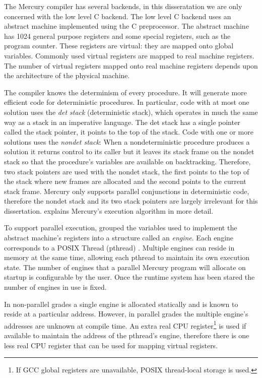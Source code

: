 
The Mercury compiler has several backends,
in this disseratation we are only concerned with the low level C backend.
The low level C backend uses an abstract machine implemented using the C
preprocessor.
The abstract machine has 1024 general purpose registers and some
special registers, such as the program counter.
These registers are virtual:
they are mapped onto global variables.
Commonly used virtual registers are mapped to real machine registers.
The number of virtual registers mapped onto real machine registers depends upon
the architecture of the physical machine.

The compiler knows the determinism of every procedure.
It will generate more efficient code for deterministic procedures.
In particular,
code with at most one solution uses the \emph{det stack} (deterministic
stack),
which operates in much the same way as a stack in an imperative
language.
The det stack has a single pointer called the stack pointer,
it points to the top of the stack.
Code with one or more solutions uses the \emph{nondet stack}:
When a nondeterministic procedure produces a solution it returns control to
its caller but
it leaves its stack frame on the nondet stack so that
the procedure's variables are available on backtracking.
Therefore,
two stack pointers are used with the nondet stack,
the first points to the top of the stack where new frames are allocated
and the second points to the current stack frame.
Mercury only supports parallel conjunctions in deterministic code,
therefore the nondet stack and its two stack pointers are largely irrelevant
for this dissertation.
\citet{mercury_jlp} explains Mercury's execution algorithm in more detail.

To support parallel execution,
\citet{conway:2002:par} grouped the variables used to implement the abstract
machine's registers into a structure called an \emph{engine}.
Each engine corresponds to a POSIX Thread (pthread)
\citep{butenhof1997:pthreads}.
Multiple engines can reside in memory at the same time,
allowing each pthread to maintain its own execution state.
The number of engines that a parallel Mercury program will allocate on startup
is configurable by the user.
Once the runtime system has been stared the number of engines in use is
fixed.

In non-parallel grades a single engine is allocated statically and is known
to reside at a particular address.
However,
in parallel grades the multiple engine's addresses are unknown at compile
time.
An extra real CPU register\footnote{
    If GCC global registers are unavailable,
    POSIX thread-local storage is used.
}
is used if available to maintain the address of
the pthread's engine,
therefore there is one less real CPU register that can be used for mapping
virtual registers.

